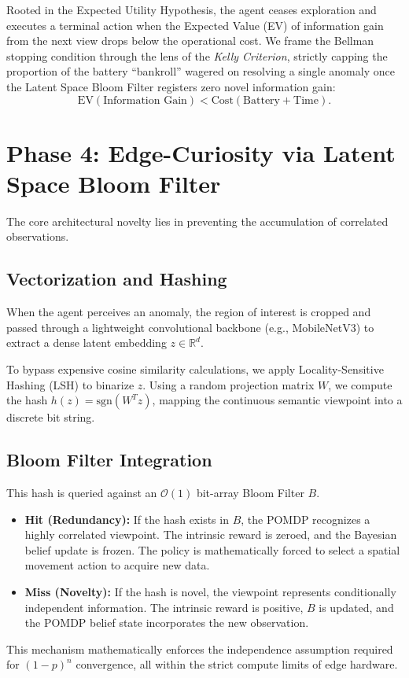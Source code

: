 \documentclass[conference]{IEEEtran}
\begin{document}
Rooted in the Expected Utility Hypothesis, the agent ceases exploration and executes a terminal action when the Expected Value (EV) of information gain from the next view drops below the operational cost. We frame the Bellman stopping condition through the lens of the \textit{Kelly Criterion}, strictly capping the proportion of the battery ``bankroll'' wagered on resolving a single anomaly once the Latent Space Bloom Filter registers zero novel information gain:
\begin{equation}
    \mathrm{EV}(\text{Information Gain}) < \mathrm{Cost}(\text{Battery} + \text{Time}).
\end{equation}

\section{Phase 4: Edge-Curiosity via Latent Space Bloom Filter}
The core architectural novelty lies in preventing the accumulation of correlated observations. 

\subsection{Vectorization and Hashing}
When the agent perceives an anomaly, the region of interest is cropped and passed through a lightweight convolutional backbone (e.g., MobileNetV3) to extract a dense latent embedding $z \in \mathbb{R}^d$. 

To bypass expensive cosine similarity calculations, we apply Locality-Sensitive Hashing (LSH) to binarize $z$. Using a random projection matrix $W$, we compute the hash $h(z) = \text{sgn}(W^T z)$, mapping the continuous semantic viewpoint into a discrete bit string.

\subsection{Bloom Filter Integration}
This hash is queried against an $\mathcal{O}(1)$ bit-array Bloom Filter $B$. 
\begin{itemize}
    \item \textbf{Hit (Redundancy):} If the hash exists in $B$, the POMDP recognizes a highly correlated viewpoint. The intrinsic reward is zeroed, and the Bayesian belief update is frozen. The policy is mathematically forced to select a spatial movement action to acquire new data.
    \item \textbf{Miss (Novelty):} If the hash is novel, the viewpoint represents conditionally independent information. The intrinsic reward is positive, $B$ is updated, and the POMDP belief state incorporates the new observation.
\end{itemize}
This mechanism mathematically enforces the independence assumption required for $(1-p)^n$ convergence, all within the strict compute limits of edge hardware.
\end{document}
